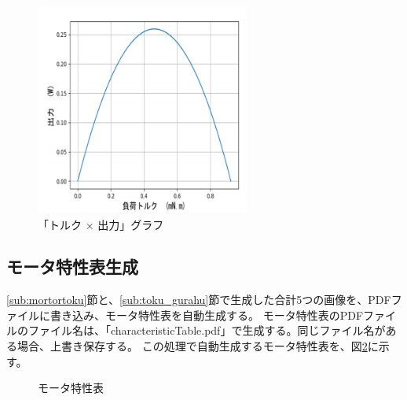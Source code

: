 \begin{figure}[t]
	\centering
	\includegraphics[width=7cm]{./Image/output.png}
	\caption{「トルク $\times$ 出力」グラフ}
	\label{fig:output}
\end{figure}
\subsection{モータ特性表生成}\label{sub:}
\ref{sub:mortortoku}節と、\ref{sub:toku_gurahu}節で生成した合計5つの画像を、PDFファイルに書き込み、モータ特性表を自動生成する。
モータ特性表のPDFファイルのファイル名は、「characteristicTable.pdf」で生成する。同じファイル名がある場合、上書き保存する。
この処理で自動生成するモータ特性表を、図\ref{fig:tokuseihyou}に示す。
\begin{figure}[t]
	\centering
	\caption{モータ特性表}
	\label{fig:tokuseihyou}
\end{figure}